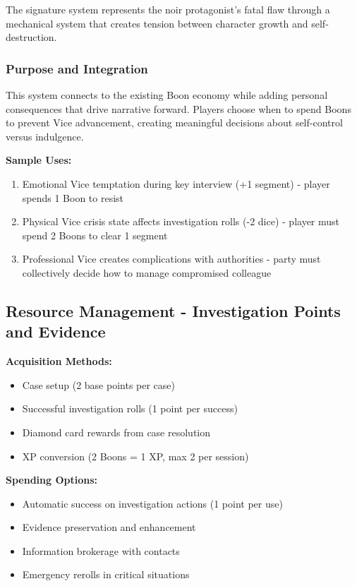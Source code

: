 \documentclass[11pt]{article}
\newenvironment{mechanic}[1]{%
  \begin{mdframed}[backgroundcolor=tableheader, linewidth=1pt, linecolor=accentcolor]%
  \subsubsection*{#1}%
}{%
  \end{mdframed}%
}
\begin{document}
The signature system represents the noir protagonist's fatal flaw through a mechanical system that creates tension between character growth and self-destruction.

\begin{mechanic}{Purpose and Integration}
This system connects to the existing Boon economy while adding personal consequences that drive narrative forward. Players choose when to spend Boons to prevent Vice advancement, creating meaningful decisions about self-control versus indulgence.
\end{mechanic}

\textbf{Sample Uses:}
\begin{enumerate}
\item Emotional Vice temptation during key interview (+1 segment) - player spends 1 Boon to resist
\item Physical Vice crisis state affects investigation rolls (-2 dice) - player must spend 2 Boons to clear 1 segment
\item Professional Vice creates complications with authorities - party must collectively decide how to manage compromised colleague
\end{enumerate}

\subsection{Resource Management - Investigation Points and Evidence}

\textbf{Acquisition Methods:}
\begin{itemize}
\item Case setup (2 base points per case)
\item Successful investigation rolls (1 point per success)
\item Diamond card rewards from case resolution
\item XP conversion (2 Boons = 1 XP, max 2 per session)
\end{itemize}

\textbf{Spending Options:}
\begin{itemize}
\item Automatic success on investigation actions (1 point per use)
\item Evidence preservation and enhancement
\item Information brokerage with contacts
\item Emergency rerolls in critical situations
\end{itemize}
\end{document}
